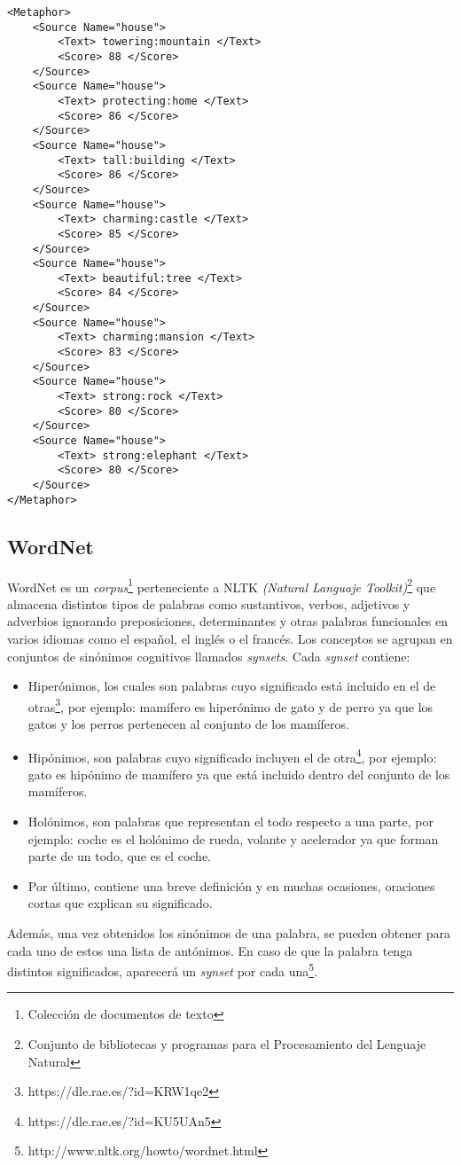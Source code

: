 \lstset{language=XML}
\begin{lstlisting}[caption= Ejemplo formatos XML Metaphor Magnet para la palabra \textit{house}, label={lst:xmlmetaphormagnet}, frame=single]
<Metaphor>
	<Source Name="house">
		<Text> towering:mountain </Text>
		<Score> 88 </Score>
	</Source>
	<Source Name="house">
		<Text> protecting:home </Text>
		<Score> 86 </Score>
	</Source>
	<Source Name="house">
		<Text> tall:building </Text>
		<Score> 86 </Score>
	</Source>
	<Source Name="house">
		<Text> charming:castle </Text>
		<Score> 85 </Score>
	</Source>
	<Source Name="house">
		<Text> beautiful:tree </Text>
		<Score> 84 </Score>
	</Source>
	<Source Name="house">
		<Text> charming:mansion </Text>
		<Score> 83 </Score>
	</Source>
	<Source Name="house">
		<Text> strong:rock </Text>
		<Score> 80 </Score>
	</Source>
	<Source Name="house">
		<Text> strong:elephant </Text>
		<Score> 80 </Score>
	</Source>
</Metaphor>
\end{lstlisting}




\subsection{WordNet}
\label{cap:subsec:wordnet}
WordNet es un \textit{corpus}\footnote{Colección de documentos de texto} perteneciente a NLTK \textit{(Natural Languaje Toolkit)}\footnote{Conjunto de bibliotecas y programas para el Procesamiento del Lenguaje Natural} que almacena distintos tipos de palabras como sustantivos, verbos, adjetivos y adverbios ignorando preposiciones, determinantes y otras palabras funcionales en varios idiomas como el español, el inglés o el francés. Los conceptos se agrupan en conjuntos de sinónimos cognitivos llamados \textit{synsets}. Cada \textit{synset} contiene:
\begin{itemize}
	
	\item Hiperónimos, los cuales son palabras cuyo significado está incluido en el de otras\footnote{https://dle.rae.es/?id=KRW1qe2}, por ejemplo: mamífero es hiperónimo de gato y de perro ya que los gatos y los perros pertenecen al conjunto de los mamíferos.
	\item Hipónimos, son palabras cuyo significado incluyen el de otra\footnote{https://dle.rae.es/?id=KU5UAn5}, por ejemplo: gato es hipónimo de mamífero ya que está incluido dentro del conjunto de los mamíferos.
	\item Holónimos, son palabras que representan el todo respecto a una parte, por ejemplo: coche es el holónimo de rueda, volante y acelerador ya que forman parte de un todo, que es el coche.
	\item Por último, contiene una breve definición y en muchas ocasiones, oraciones cortas que explican su significado.		
\end{itemize} 
Además, una vez obtenidos los sinónimos de una palabra, se pueden obtener para cada uno de estos una lista de antónimos. En caso de que la palabra tenga distintos significados, aparecerá un \textit{synset} por cada una\footnote{http://www.nltk.org/howto/wordnet.html}.

